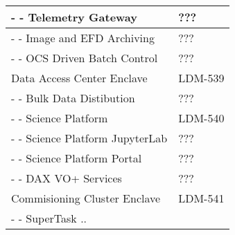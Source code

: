 \begin{longtable}{|p{}|p{}|}
- - Telemetry Gateway &  ??? \\ \hline 
- - Image and EFD Archiving &  ??? \\ \hline 
- - OCS Driven Batch Control &  ??? \\ \hline 
\rowcolor{orange} 
 Data Access Center Enclave &  LDM-539 \\ \hline 
- - Bulk Data Distibution &  ??? \\ \hline 
\rowcolor{yellow} 
 - - Science Platform &  LDM-540 \\ \hline 
- - Science Platform JupyterLab &  ??? \\ \hline 
- - Science Platform Portal &  ??? \\ \hline 
- - DAX VO+ Services &  ??? \\ \hline 
\rowcolor{orange} 
 Commisioning Cluster Enclave &  LDM-541 \\ \hline 
- - SuperTask .. &   \\ \hline 
\end{longtable} 
